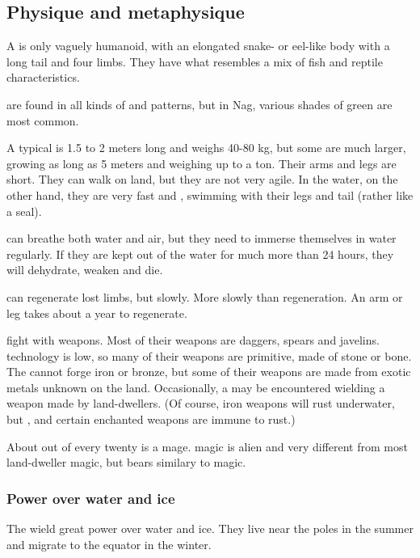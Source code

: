 \subsection{Physique and metaphysique}
A \naga{} is only vaguely humanoid, with an elongated snake- or eel-like body with a long tail and four limbs. 
They have what resembles a mix of fish and reptile characteristics. 

\Nagae{} are found in all kinds of \colours and patterns, but in Nag, various shades of green are most common. 

A typical \naga{} is 1.5 to 2 meters long and weighs 40-80 kg, but some are much larger, growing as long as 5 meters and weighing up to a ton. 
Their arms and legs are short. 
They can walk on land, but they are not very agile. 
In the water, on the other hand, they are very fast and \manoeuvrable, swimming with their legs and tail (rather like a seal). 

\Nagae{} can breathe both water and air, but they need to immerse themselves in water regularly. 
If they are kept out of the water for much more than 24 hours, they will dehydrate, weaken and die. 

\Nagae{} can regenerate lost limbs, but slowly. 
More slowly than \meccaran{} regeneration. 
An arm or leg takes about a year to regenerate. 

\Nagae{} fight with weapons. 
Most of their weapons are daggers, spears and javelins. 
\Naga{} technology is low, so many of their weapons are primitive, made of stone or bone. 
The \nagae{} cannot forge iron or bronze, but some of their weapons are made from exotic metals unknown on the land. 
Occasionally, a \naga{} may be encountered wielding a weapon made by land-dwellers. 
(Of course, iron weapons will rust underwater, but \dragonsteel, \truesilver{} and certain enchanted weapons are immune to rust.) 

About \naga{} out of every twenty is a mage. 
\Naga{} magic is alien and very different from most land-dweller magic, but bears similary to \draconic{} magic. 





\subsubsection{Power over water and ice}
The \nagae{} wield great power over water and ice. They live near the poles in the summer and migrate to the equator in the winter. 

